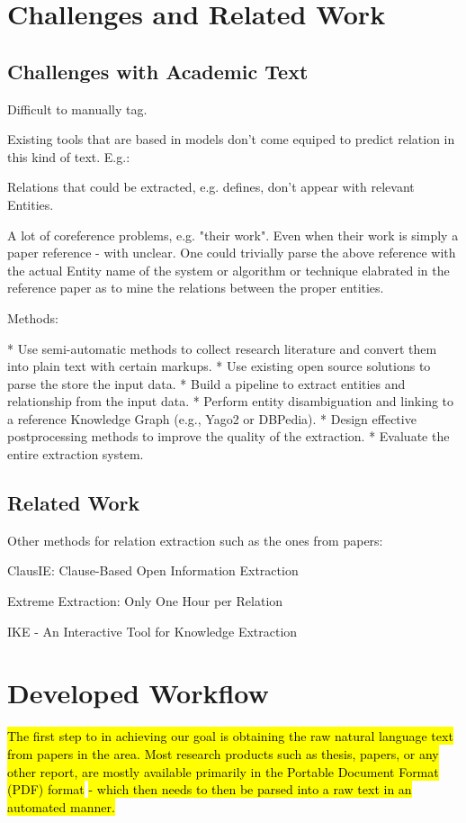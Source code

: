 \documentclass[11pt,a4paper,openright]{memoir}
\begin{document}
\chapter{Challenges and Related Work}

\section{Challenges with Academic Text}

Difficult to manually tag.

Existing tools that are based in models don't come equiped to predict relation in this kind of text. E.g.:

Relations that could be extracted, e.g. deﬁnes, don't appear with relevant Entities.

A lot of coreference problems, e.g. "their work". Even when their work is simply a paper reference - with unclear. One could trivially parse the above reference with the actual Entity name of the system or algorithm or technique elabrated in the reference paper as to mine the relations between the proper entities.

Methods:

* Use semi-automatic methods to collect research literature and convert them into plain text with certain markups. 
* Use existing open source solutions to parse the store the input data. 
* Build a pipeline to extract entities and relationship from the input data. 
* Perform entity disambiguation and linking to a reference Knowledge Graph (e.g., Yago2 or DBPedia). 
* Design effective postprocessing methods to improve the quality of the extraction.
* Evaluate the entire extraction system.

\section{Related Work}

Other methods for relation extraction such as the ones from papers:

ClausIE: Clause-Based Open Information Extraction

Extreme Extraction: Only One Hour per Relation

IKE - An Interactive Tool for Knowledge Extraction


\chapter{Developed Workflow}

\hl{The first step to in achieving our goal is obtaining the raw natural language text from papers in the area. Most research products such as thesis, papers, or any other report, are mostly available primarily in the Portable Document Format (PDF) format} \cite{pdf} \hl{- which then needs to then be parsed into a raw text in an automated manner.}
\end{document}

